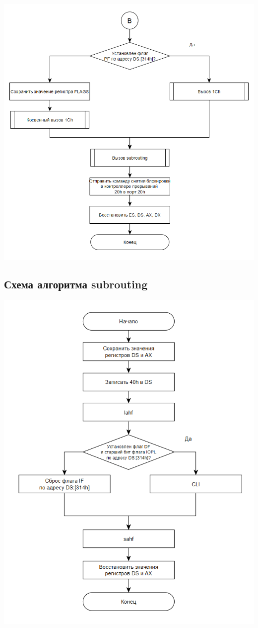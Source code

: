\documentclass{article}
\begin{document}
\begin{center}
	\includegraphics{tools/Screenshot_2.png}
\end{center}
\subsection{Схема алгоритма subrouting}

\begin{center}
	\includegraphics[height=0.98\textheight]{tools/Screenshot_1.png}
\end{center}
\end{document}
